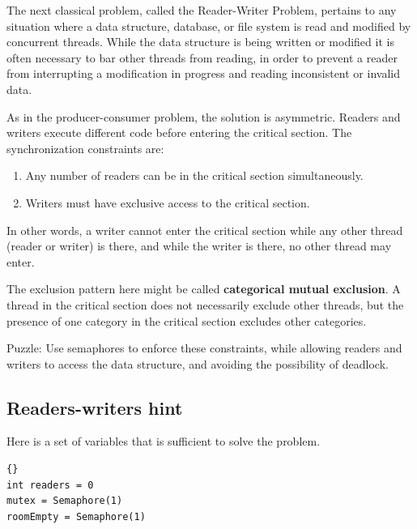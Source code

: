 \documentclass{book}
\newcommand{\clearemptydoublepage}{\newpage\cleardoublepage}
\begin{document}
The next classical problem, called the Reader-Writer Problem, pertains
to any situation where a data structure, database, or file system is
read and modified by concurrent threads.  While the data structure is
being written or modified it is often necessary to bar other threads
from reading, in order to prevent a reader from interrupting a
modification in progress and reading inconsistent or invalid data.

As in the producer-consumer problem, the solution is asymmetric.
Readers and writers execute different code before entering the
critical section.  The synchronization constraints are:

\begin{enumerate}

\item Any number of readers can be in the critical section
simultaneously.

\item Writers must have exclusive access to the critical section.

\end{enumerate}

In other words, a writer cannot enter the critical section while
any other thread (reader or writer) is there, and while the writer
is there, no other thread may enter.

The exclusion pattern here might be called {\bf categorical
mutual exclusion}.  A thread in the critical section
does not necessarily exclude other threads, but the presence
of one category in the critical section excludes other
categories.

Puzzle: Use semaphores to enforce these constraints, while allowing
readers and writers to access the data structure, and avoiding
the possibility of deadlock.


\clearemptydoublepage
\subsection{Readers-writers hint}

Here is a set of variables that is sufficient to solve the
problem.

\begin{latin}
\begin{latin}
\begin{lstlisting}[title={Readers-writers initialization}]{}
int readers = 0
mutex = Semaphore(1)
roomEmpty = Semaphore(1)
\end{lstlisting}
\end{latin}
\end{latin}
\end{document}
